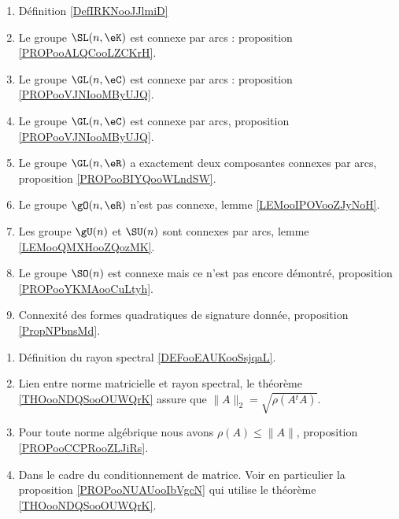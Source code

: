     \begin{enumerate}
        \item
            Définition \ref{DefIRKNooJJlmiD}
        \item
            Le groupe \( \SL(n,\eK)\) est connexe par arcs : proposition \ref{PROPooALQCooLZCKrH}.
        \item
            Le groupe \( \GL(n,\eC)\) est connexe par arcs : proposition \ref{PROPooVJNIooMByUJQ}.
        \item
            Le groupe \( \GL(n,\eC)\) est connexe par arcs, proposition \ref{PROPooVJNIooMByUJQ}.
        \item
            Le groupe \( \GL(n,\eR)\) a exactement deux composantes connexes par arcs, proposition \ref{PROPooBIYQooWLndSW}.
        \item
            Le groupe \( \gO(n,\eR)\) n'est pas connexe, lemme \ref{LEMooIPOVooZJyNoH}.
        \item
            Les groupe \( \gU(n)\) et \( \SU(n)\) sont connexes par arcs, lemme \ref{LEMooQMXHooZQozMK}.
        \item
            Le groupe \( \SO(n)\) est connexe mais ce n'est pas encore démontré, proposition \ref{PROPooYKMAooCuLtyh}.
        \item 
            Connexité des formes quadratiques de signature donnée, proposition \ref{PropNPbnsMd}.
        \end{enumerate}

    \begin{enumerate}
        \item
            Définition du rayon spectral \ref{DEFooEAUKooSsjqaL}.
        \item
            Lien entre norme matricielle et rayon spectral, le théorème \ref{THOooNDQSooOUWQrK} assure que $\|A\|_2=\sqrt{\rho(A{^t}A)}$.
        \item
            Pour toute norme algébrique nous avons \( \rho(A)\leq \| A \|\), proposition \ref{PROPooCCPRooZLJiRs}.
        \item
            Dans le cadre du conditionnement de matrice. Voir en particulier la proposition \ref{PROPooNUAUooIbVgcN} qui utilise le théorème \ref{THOooNDQSooOUWQrK}.
        \end{enumerate}

